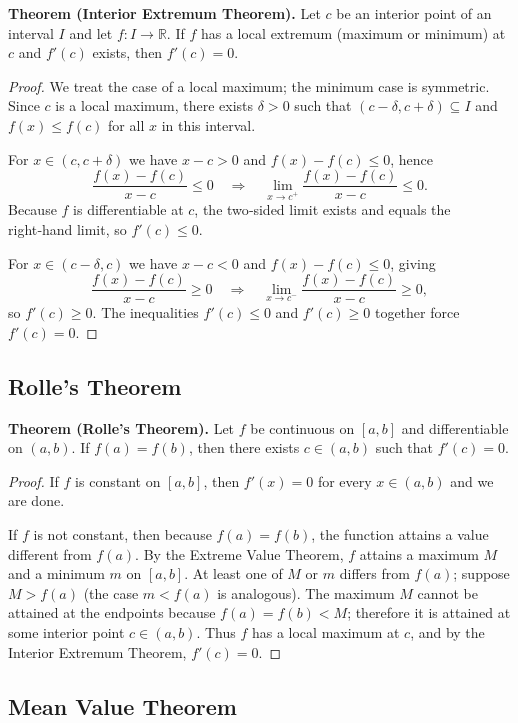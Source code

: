 \documentclass[12pt,a4paper]{article}
\theoremstyle{definition}
\newcommand{\R}{\mathbb{R}}
\begin{document}
\textbf{Theorem (Interior Extremum Theorem).} Let \(c\) be an interior point of an interval \(I\) and let \(f:I\to\R\). If \(f\) has a local extremum (maximum or minimum) at \(c\) and \(f'(c)\) exists, then \(f'(c)=0\).

\begin{proof}
We treat the case of a local maximum; the minimum case is symmetric. Since \(c\) is a local maximum, there exists \(\delta>0\) such that \((c-\delta,c+\delta)\subseteq I\) and \(f(x)\le f(c)\) for all \(x\) in this interval.

For \(x\in(c,c+\delta)\) we have \(x-c>0\) and \(f(x)-f(c)\le0\), hence
\[
\frac{f(x)-f(c)}{x-c}\le0 \quad\Longrightarrow\quad \lim_{x\to c^+}\frac{f(x)-f(c)}{x-c}\le0.
\]
Because \(f\) is differentiable at \(c\), the two‑sided limit exists and equals the right‑hand limit, so \(f'(c)\le0\).

For \(x\in(c-\delta,c)\) we have \(x-c<0\) and \(f(x)-f(c)\le0\), giving
\[
\frac{f(x)-f(c)}{x-c}\ge0 \quad\Longrightarrow\quad \lim_{x\to c^-}\frac{f(x)-f(c)}{x-c}\ge0,
\]
so \(f'(c)\ge0\). The inequalities \(f'(c)\le0\) and \(f'(c)\ge0\) together force \(f'(c)=0\).
\end{proof}

\subsection{Rolle's Theorem}

\textbf{Theorem (Rolle's Theorem).} Let \(f\) be continuous on \([a,b]\) and differentiable on \((a,b)\). If \(f(a)=f(b)\), then there exists \(c\in(a,b)\) such that \(f'(c)=0\).

\begin{proof}
If \(f\) is constant on \([a,b]\), then \(f'(x)=0\) for every \(x\in(a,b)\) and we are done.

If \(f\) is not constant, then because \(f(a)=f(b)\), the function attains a value different from \(f(a)\). By the Extreme Value Theorem, \(f\) attains a maximum \(M\) and a minimum \(m\) on \([a,b]\). At least one of \(M\) or \(m\) differs from \(f(a)\); suppose \(M>f(a)\) (the case \(m<f(a)\) is analogous). The maximum \(M\) cannot be attained at the endpoints because \(f(a)=f(b)<M\); therefore it is attained at some interior point \(c\in(a,b)\). Thus \(f\) has a local maximum at \(c\), and by the Interior Extremum Theorem, \(f'(c)=0\).
\end{proof}

\subsection{Mean Value Theorem}
\end{document}
